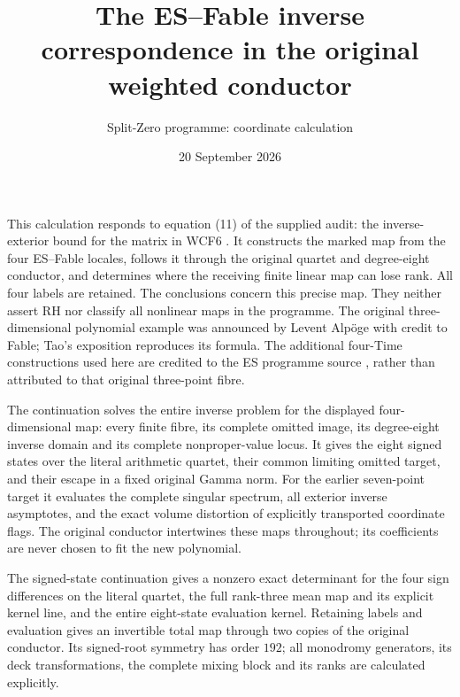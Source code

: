 \documentclass[11pt]{article}
\title{The ES--Fable inverse correspondence in the original weighted conductor}
\author{Split-Zero programme: coordinate calculation}
\date{20 September 2026}
\begin{document}
\maketitle

This calculation responds to equation (11) of the supplied audit: the
inverse-exterior bound for the matrix in WCF6 \cite{WCF}. It constructs
the marked map from the four ES--Fable locales, follows it through the
original quartet and degree-eight conductor, and determines where the
receiving finite linear map can lose rank. All four labels are retained.
The conclusions concern this precise map. They neither assert RH nor
classify all nonlinear maps in the programme.
The original three-dimensional polynomial example was announced by
Levent Alp\"oge with credit to Fable; Tao's exposition \cite{Tao}
reproduces its formula. The additional four-Time constructions used here
are credited to the ES programme source \cite{ES}, rather than attributed
to that original three-point fibre.

The continuation solves the entire inverse problem for the displayed
four-dimensional map: every finite fibre, its complete omitted image,
its degree-eight inverse domain and its complete nonproper-value locus.
It gives the eight signed states over the literal arithmetic quartet,
their common limiting omitted target, and their escape in a fixed
original Gamma norm. For the earlier seven-point target it evaluates
the complete singular spectrum, all exterior inverse asymptotes, and
the exact volume distortion of explicitly transported coordinate flags.
The original conductor intertwines these maps throughout; its coefficients
are never chosen to fit the new polynomial.

The signed-state continuation gives a nonzero exact determinant for the
four sign differences on the literal quartet, the full rank-three mean
map and its explicit kernel line, and the entire eight-state evaluation
kernel. Retaining labels and evaluation gives an invertible total map
through two copies of the original conductor. Its signed-root symmetry
has order $192$; all monodromy generators, its deck transformations,
the complete mixing block and its ranks are calculated explicitly.
\end{document}
